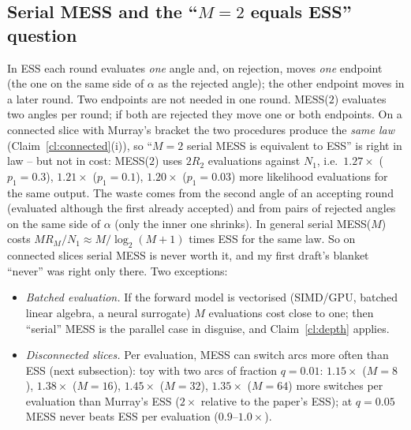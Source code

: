 \documentclass[11pt,a4paper]{article}
\theoremstyle{remark}
\begin{document}
\subsection{Serial MESS and the ``$M=2$ equals ESS'' question}\label{sec:serial}
In ESS each round evaluates \emph{one} angle and, on rejection, moves \emph{one} endpoint (the one on the same side of $\alpha$ as the rejected angle); the other endpoint moves in a later round. Two endpoints are not needed in one round. MESS($2$) evaluates two angles per round; if both are rejected they move one or both endpoints. On a connected slice with Murray's bracket the two procedures produce the \emph{same law} (Claim~\ref{cl:connected}(i)), so ``$M=2$ serial MESS is equivalent to ESS'' is right in law -- but not in cost: MESS($2$) uses $2R_2$ evaluations against $N_1$, i.e.\ $1.27\times$ ($p_1=0.3$), $1.21\times$ ($p_1=0.1$), $1.20\times$ ($p_1=0.03$) more likelihood evaluations for the same output. The waste comes from the second angle of an accepting round (evaluated although the first already accepted) and from pairs of rejected angles on the same side of $\alpha$ (only the inner one shrinks). In general serial MESS($M$) costs $MR_M/N_1\approx M/\log_2(M+1)$ times ESS for the same law. So on connected slices serial MESS is never worth it, and my first draft's blanket ``never'' was right only there. Two exceptions:
\begin{itemize}[leftmargin=*]
\item \emph{Batched evaluation.} If the forward model is vectorised (SIMD/GPU, batched linear algebra, a neural surrogate) $M$ evaluations cost close to one; then ``serial'' MESS is the parallel case in disguise, and Claim~\ref{cl:depth} applies.
\item \emph{Disconnected slices.} Per evaluation, MESS can switch arcs more often than ESS (next subsection): toy with two arcs of fraction $q=0.01$: $1.15\times$ ($M=8$), $1.38\times$ ($M=16$), $1.45\times$ ($M=32$), $1.35\times$ ($M=64$) more switches per evaluation than Murray's ESS ($2\times$ relative to the paper's ESS); at $q=0.05$ MESS never beats ESS per evaluation ($0.9$--$1.0\times$).
\end{itemize}
\end{document}
